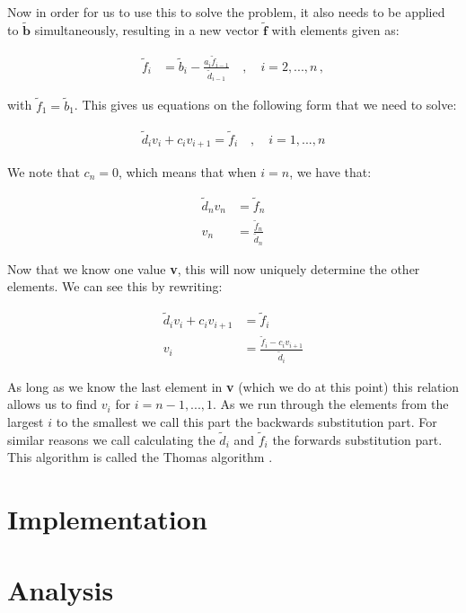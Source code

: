 \documentclass[english,notitlepage,reprint]{revtex4-1}  %
\begin{document}
Now in order for us to use this to solve the problem, it also needs to be applied to $\tilde{\textbf{b}}$ simultaneously, resulting in a new vector $\tilde{\textbf{f}}$ with elements given as:

\begin{align*}
\tilde{f}_i &= \tilde{b}_i - \frac{a_i \tilde{f}_{i-1}}{\tilde{d}_{i-1}} \quad , \quad i = 2,...,n \, ,
\end{align*}

with $\tilde{f}_1 = \tilde{b}_1$. This gives us equations on the following form that we need to solve:

\begin{align*}
\tilde{d}_i v_i  + c_i v_{i+1} = \tilde{f}_i \quad , \quad i = 1,...,n
\end{align*}

We note that $c_n = 0$, which means that when $i=n$, we have that:

\begin{align*}
\tilde{d}_n v_n &= \tilde{f}_n \\
v_n &= \frac{\tilde{f}_n}{\tilde{d}_n}
\end{align*}

Now that we know one value \textbf{v}, this will now uniquely determine the other elements. We can see this by rewriting:

\begin{align*}
\tilde{d}_i v_i  + c_i v_{i+1} &= \tilde{f}_i \\
v_i &= \frac{\tilde{f}_i - c_i v_{i+1}}{\tilde{d}_i}
\end{align*}

As long as we know the last element in \textbf{v} (which we do at this point) this relation allows us to find $v_i$ for $i = n-1,...,1$. As we run through the elements from the largest $i$ to the smallest we call this part the backwards substitution part. For similar reasons we call calculating the $\tilde{d}_i$ and $\tilde{f}_i$ the forwards substitution part. This algorithm is called the Thomas algorithm \citep{Thomas1949}.




\section{Implementation} \label{sec:III}

\section{Analysis} \label{sec:IV}
\end{document}
